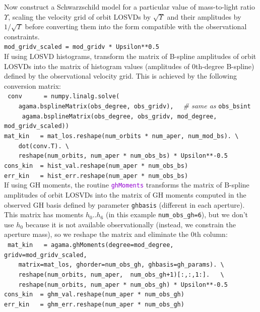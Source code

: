 \documentclass[12pt]{article}
\newcommand{\ttt}[1]{\textcolor{darkviolet}{\texttt{#1}}}
\begin{document}
Now construct a Schwarzschild model for a particular value of mass-to-light ratio $\Upsilon$, scaling the velocity grid of orbit LOSVDs by $\sqrt{\Upsilon}$ and their amplitudes by $1/\sqrt{\Upsilon}$ before converting them into the form compatible with the observational constraints.\\[2mm]
\texttt{mod_gridv_scaled = mod_gridv * Upsilon**0.5}\\[2mm]
If using LOSVD histograms, transform the matrix of B-spline amplitudes of orbit LOSVDs into the matrix of histogram values (amplitudes of 0th-degree B-spline) defined by the observational velocity grid. This is achieved by the following conversion matrix:\\[2mm]
\texttt{
conv~~~~~~= numpy.linalg.solve(\\
\mbox{}~~~~agama.bsplineMatrix(obs_degree, obs_gridv),}
{\color{Sepia}\textit{\ \ \# same as }\texttt{obs_bsint}}\\
\texttt{
\mbox{}~~~~agama.bsplineMatrix(obs_degree, obs_gridv, mod_degree, mod_gridv_scaled))\\
mat_kin~~~= mat_los.reshape(num_orbits * num_aper, num_mod_bs). \textbackslash\\
\mbox{}~~~~dot(conv.T). \textbackslash\\
\mbox{}~~~~reshape(num_orbits, num_aper * num_obs_bs) * Upsilon**-0.5\\
cons_kin~~= hist_val.reshape(num_aper * num_obs_bs)\\
err_kin~~~= hist_err.reshape(num_aper * num_obs_bs)}\\[2mm]
If using GH moments, the routine \ttt{ghMoments} transforms the matrix of B-spline amplitudes of orbit LOSVDs into the matrix of GH moments computed in the observed GH basis defined by parameter \texttt{ghbasis} (different in each aperture). This matrix has moments $h_0..h_6$ (in this example \texttt{num_obs_gh=6}), but we don't use $h_0$ because it is not available observationally (instead, we constrain the aperture mass), so we reshape the matrix and eliminate the 0th column:\\[2mm]
\texttt{
mat_kin~~~= agama.ghMoments(degree=mod_degree, gridv=mod_gridv_scaled, \\
\mbox{}~~~~matrix=mat_los, ghorder=num_obs_gh, ghbasis=gh_params). \textbackslash\\
\mbox{}~~~~reshape(num_orbits, num_aper,~ num_obs_gh+1)[:,:,1:].~~ \textbackslash\\
\mbox{}~~~~reshape(num_orbits, num_aper * num_obs_gh) * Upsilon**-0.5\\
cons_kin~~= ghm_val.reshape(num_aper * num_obs_gh)\\
err_kin~~~= ghm_err.reshape(num_aper * num_obs_gh)}\\[2mm]
\end{document}
